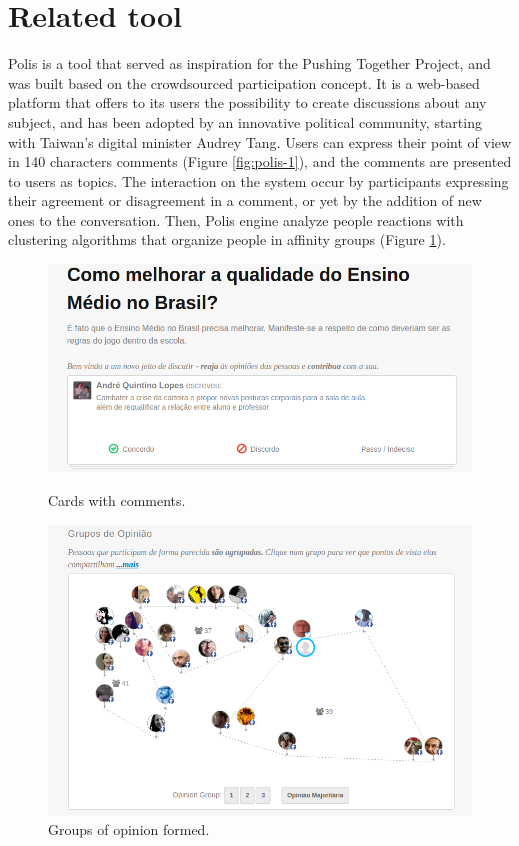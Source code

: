 \documentclass{llncs}
\begin{document}
\section{Related tool}

Polis is a tool that served as inspiration for the Pushing Together Project, and
was built based on the crowdsourced participation concept. It
is a web-based platform that offers to its users the possibility to
create discussions about any subject, and has been adopted by an
innovative political community, starting with Taiwan's digital minister
Audrey Tang. Users can express their point of view in
140 characters comments (Figure \ref{fig:polis-1}), and the comments are presented
to users as topics. The interaction on the system occur by
participants expressing their agreement or disagreement in a comment, or yet by
the addition of new ones to the conversation. Then, Polis engine analyze people
reactions with clustering algorithms that organize
people in affinity groups (Figure \ref{fig:polis-2}).

 \begin{figure}[hbt]
   \centering
   \begin{minipage}{.50\textwidth}
     \includegraphics[width=.9\linewidth]{images/polis1.png}
     \caption{Cards with comments.}
     \label{fig:polis-1}
   \end{minipage}
   \begin{minipage}{.49\textwidth}
     \includegraphics[width=.9\linewidth]{images/polis2.png}
     \caption{Groups of opinion formed.}
     \label{fig:polis-2}
   \end{minipage}
 \end{figure}
\end{document}
